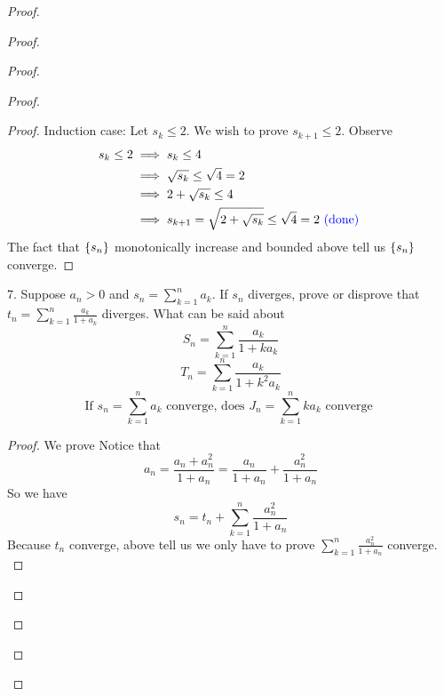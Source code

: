 \documentclass{report}
\begin{document}
\begin{proof}
\begin{proof}
\begin{proof}
\begin{proof}
\begin{proof}
Induction case: Let $s_k\leq 2$. We wish to prove  $s_{k+1}\leq 2$. Observe
\begin{align}
  s_k\leq 2&\implies s_k\leq 4\\
  &\implies \sqrt{s_k}\leq \sqrt{4} =2\\
  &\implies 2+\sqrt{s_k} \leq 4\\
  &\implies s_{k+1}=\sqrt{2+\sqrt{s_k} }\leq \sqrt{4}=2 \textcolor{blue}{\text{ (done) }}
\end{align}
The fact that $\{ s_n \}$ monotonically increase and bounded above tell us $\{ s_n \}$ converge.
\end{proof}
\begin{question}{}{}
7. Suppose $a_n > 0$ and $s_n = \sum _{k=1}^{n} a_k$. If $s_n$ diverges, prove or disprove that $t_n=\sum_{k=1}^{n} \frac{a_k}{1+a_k}$ diverges. What can be said about
\begin{equation}
S_n=\sum_{k=1}^n \frac{a_k}{1+ka_k}
\end{equation}
\begin{equation}
T_n=\sum_{k=1}^n \frac{a_k}{1+k^2a_k}
\end{equation}
\begin{equation}
\text{If } s_n=\sum_{k=1}^n a_k\text{ converge, does }J_n=\sum_{k=1}^n ka_k\text{ converge }
\end{equation}
\end{question}
\begin{proof}
  We prove 
Notice that
\begin{equation}
a_n=\frac{a_n+a_n^2}{1+a_n}=\frac{a_n}{1+a_n}+\frac{a_n^2}{1+a_n}
\end{equation}
So we have
\begin{equation}
s_n=t_n+\sum_{k=1}^n \frac{a_n^2}{1+a_n}
\end{equation}
Because $t_n$ converge, above tell us we only have to prove  $\sum_{k=1}^n \frac{a_n^2}{1+a_n}$ converge.\\


\end{proof}
\end{proof}
\end{proof}
\end{proof}
\end{proof}
\end{document}
